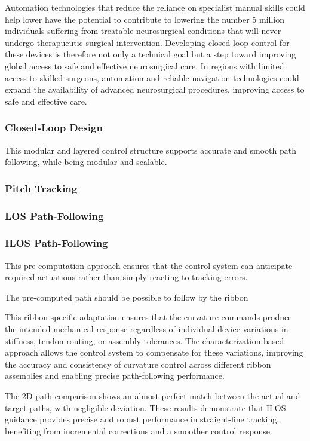 Automation technologies that reduce the reliance on specialist manual skills could help lower have the potential to contribute to lowering the number 5 million individuals suffering from treatable neurosurgical conditions that will never undergo therapueutic surgical intervention. Developing closed-loop control for these devices is therefore not only a technical goal but a step toward improving global access to safe and effective neurosurgical care. In regions with limited access to skilled surgeons, automation and reliable navigation technologies could expand the availability of advanced neurosurgical procedures, improving access to safe and effective care.

\textbf{}



\subsubsection{Closed-Loop Design}
This modular and layered control structure supports accurate and smooth path following, while being modular and scalable. 





\subsubsection{Pitch Tracking}


\subsubsection{LOS Path-Following}



\subsubsection{ILOS Path-Following}

This pre-computation approach ensures that the control system can anticipate required actuations rather than simply reacting to tracking errors. 

The pre-computed path should be possible to follow by the ribbon

This ribbon-specific adaptation ensures that the curvature commands produce the intended mechanical response regardless of individual device variations in stiffness, tendon routing, or assembly tolerances. The characterization-based approach allows the control system to compensate for these variations, improving the accuracy and consistency of curvature control across different ribbon assemblies and enabling precise path-following performance.

The 2D path comparison shows an almost perfect match between the actual and target paths, with negligible deviation. These results demonstrate that ILOS guidance provides precise and robust performance in straight-line tracking, benefiting from incremental corrections and a smoother control response.